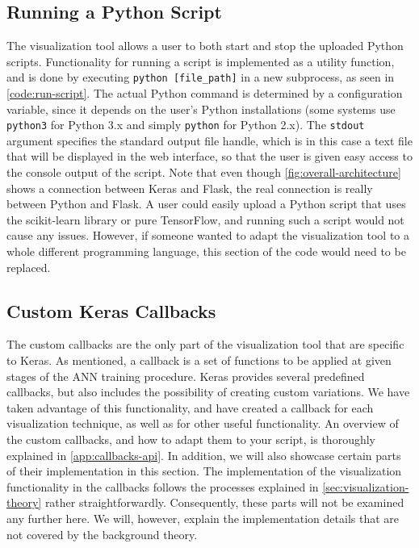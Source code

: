 \subsection{Running a Python Script}

The visualization tool allows a user to both start and stop the uploaded Python scripts. Functionality for running a script is implemented as a utility function, and is done by executing \texttt{python [file\_path]} in a new subprocess, as seen in \autoref{code:run-script}. The actual Python command is determined by a configuration variable, since it depends on the user's Python installations (some systems use \texttt{python3} for Python 3.x and simply \texttt{python} for Python 2.x). The \texttt{stdout} argument specifies the standard output file handle, which is in this case a text file that will be displayed in the web interface, so that the user is given easy access to the console output of the script. Note that even though \autoref{fig:overall-architecture} shows a connection between Keras and Flask, the real connection is really between Python and Flask. A user could easily upload a Python script that uses the scikit-learn library or pure TensorFlow, and running such a script would not cause any issues. However, if someone wanted to adapt the visualization tool to a whole different programming language, this section of the code would need to be replaced.


\subsection{Custom Keras Callbacks}

The custom callbacks are the only part of the visualization tool that are specific to Keras. As mentioned, a callback is a set of functions to be applied at given stages of the ANN training procedure. Keras provides several predefined callbacks, but also includes the possibility of creating custom variations. We have taken advantage of this functionality, and have created a callback for each visualization technique, as well as for other useful functionality. An overview of the custom callbacks, and how to adapt them to your script, is thoroughly explained in \autoref{app:callbacks-api}. In addition, we will also showcase certain parts of their implementation in this section. The implementation of the visualization functionality in the callbacks follows the processes explained in \autoref{sec:visualization-theory} rather straightforwardly. Consequently, these parts will not be examined any further here. We will, however, explain the implementation details that are not covered by the background theory. 

